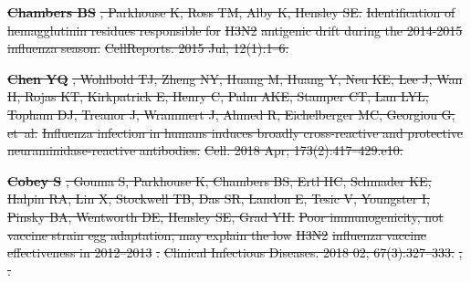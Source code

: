 \documentclass[9pt,lineno]{elife} %
\providecommand{\DIFdel}[1]{{\protect\color{red}\sout{#1}}}                      %
\providecommand{\DIFdeltex}[1]{{\protect\color{red}\sout{#1}}}                      %
\providecommand{\DIFdel}[1]{\texorpdfstring{\DIFdeltex{#1}}{}} %
\begin{document}
\textbf{%
\DIFdel{Chambers BS}}%
\DIFdel{, Parkhouse K, Ross TM, Alby K,
  Hensley SE.
}%
\DIFdel{Identification of hemagglutinin residues responsible for }%
\DIFdel{H3N2}%
\DIFdel{antigenic drift during the 2014-2015 influenza season.}%
\DIFdel{CellReports.  2015 Jul; 12(1):1--6.
}%

\textbf{%
\DIFdel{Chen YQ}}%
\DIFdel{, Wohlbold TJ, Zheng NY, Huang M, Huang
  Y, Neu KE, Lee J, Wan H, Rojas KT, Kirkpatrick E, Henry C, Palm AKE, Stamper
  CT, Lan LYL, Topham DJ, Treanor J, Wrammert J, Ahmed R, Eichelberger MC,
  Georgiou G, et~al.
}%
\DIFdel{Influenza infection in humans induces broadly cross-reactive and
  protective neuraminidase-reactive antibodies.}%
\DIFdel{Cell.  2018 Apr; 173(2):417--429.e10.
}%

\textbf{%
\DIFdel{Cobey S}}%
\DIFdel{, Gouma S, Parkhouse K, Chambers BS,
  Ertl HC, Schmader KE, Halpin RA, Lin X, Stockwell TB, Das SR, Landon E, Tesic
  V, Youngster I, Pinsky BA, Wentworth DE, Hensley SE, Grad YH.
}%
\DIFdel{Poor immunogenicity, not vaccine strain egg adaptation, may explain
  the low }%
\DIFdel{H3N2}%
\DIFdel{influenza vaccine effectiveness in 2012–2013}%
\DIFdel{.
}%
\DIFdel{Clinical Infectious Diseases.  2018 02; 67(3):327--333.
}%
\DIFdel{,
  }%
\DIFdel{.
}%
\end{document}
